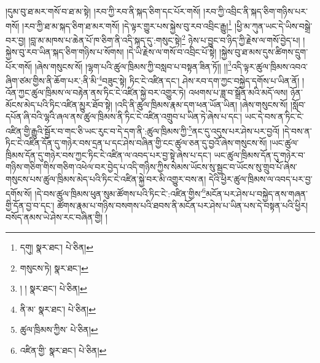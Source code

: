 །དུམ་བུ་ཐ་མར་གསོ་བ་ཐ་མ་སྟེ། །རབ་ཀྱི་རབ་ནི་སྐད་ཅིག་དང་པོར་གསོ། །རབ་ཀྱི་འབྲིང་ནི་སྐད་ཅིག་གཉིས་པར་གསོ། །རབ་ཀྱི་ཐ་མ་སྐད་ཅིག་ཐ་མར་གསོ། །དེ་ལྟར་གྱུར་པས་སྐྱེས་བུ་རབ་འབྲིང་རྒྱུ།\footnote{དགུ།  སྣར་ཐང་།  པེ་ཅིན། } །ཕྱི་མ་ཀུན་ཡང་དེ་ཡིས་བསྒྲེ་བར་བྱ། །བླ་མ་མཁས་པ་ཆེན་པོ་ཁ་ཅིག་ནི་འདི་སྐད་དུ་:གསུང་སྟེ།\footnote{གསུངས་ཏེ།  སྣར་ཐང་། } ཉེས་པ་བྱུང་བ་ཉིད་ཀྱི་རྗེས་ལ་གསོ་བྱེད་པ། །སྐྱེས་བུ་རབ་ཡིན་སྐད་ཅིག་གཉིས་པ་སོགས། །དེ་ཡི་རྗེས་ལ་གསོ་བ་འབྲིང་པོ་སྟེ། །སྐྱེས་བུ་ཐ་མས་དུས་ཚིགས་དྲུག་པོར་གསོ། །ཞེས་གསུངས་སོ། །ལྷག་པའི་ཚུལ་ཁྲིམས་ཀྱི་བསླབ་པ་བསྟན་ཟིན་ཏོ།། །།\footnote{། །  སྣར་ཐང་།  པེ་ཅིན། }འདི་ལྟར་ཚུལ་ཁྲིམས་འབའ་ཞིག་ཙམ་གྱིས་ནི་ཆོག་པར་:ནི་མི་\footnote{ནི་མ་  སྣར་ཐང་།  པེ་ཅིན། }བཟུང་སྟེ། ཏིང་ངེ་འཛིན་དང་། ཤེས་རབ་དག་ཀྱང་བསྐྱེད་དགོས་པ་ཡིན་ནོ། །འོན་ཀྱང་ཚུལ་ཁྲིམས་ལ་བརྟེན་ནས་ཏིང་ངེ་འཛིན་སྐྱེ་བར་འགྱུར་ཏེ། འཕགས་པ་ཟླ་བ་སྒྲོན་མའི་མདོ་ལས། ཉོན་མོངས་མེད་པའི་ཏིང་འཛིན་མྱུར་ཐོབ་སྟེ། །འདི་ནི་ཚུལ་ཁྲིམས་རྣམ་དག་ཕན་ཡོན་ཡིན། །ཞེས་གསུངས་སོ། །སློབ་དཔོན་ཞི་བའི་ལྷའི་ཞལ་ནས་ཚུལ་ཁྲིམས་ནི་ཏིང་ངེ་འཛིན་འགྲུབ་པ་ཡིན་ཏེ་ཞེས་པ་དང་། ཡང་དེ་བས་ན་ཏིང་ངེ་འཛིན་གྱི་རྒྱུའི་སྦྱོར་བ་གང་ཅི་ཡང་རུང་བ་དེ་དག་ནི་:ཚུལ་ཁྲིམས་ཀྱི་\footnote{ཚུལ་ཁྲིམས་ཀྱིས་  པེ་ཅིན། }ནང་དུ་འདུས་པར་ཤེས་པར་བྱའོ། །དེ་བས་ན་ཏིང་ངེ་འཛིན་དོན་དུ་གཉེར་བས་དྲན་པ་དང་ཤེས་བཞིན་གྱི་ངང་ཚུལ་ཅན་དུ་བྱའོ་ཞེས་གསུངས་སོ། །ཡང་ཚུལ་ཁྲིམས་དོན་དུ་གཉེར་བས་ཀྱང་ཏིང་ངེ་འཛིན་ལ་འབད་པར་བྱ་སྟེ་ཞེས་པ་དང་། ཡང་ཚུལ་ཁྲིམས་དོན་དུ་གཉེར་བ་གཉིས་གཅིག་གིས་གཅིག་འཕེལ་བར་བྱེད་པ་འདི་གཉིས་ཀྱིས་སེམས་ཡོངས་སུ་སྦྱང་བ་ཡོངས་སུ་གྲུབ་པོ་ཞེས་གསུངས་པས་ཚུལ་ཁྲིམས་མེད་པའི་ཏིང་ངེ་འཛིན་སྐྱེ་བར་མི་འགྱུར་བས་ན། དེའི་ཕྱིར་ཚུལ་ཁྲིམས་ལ་འབད་པར་བྱ་དགོས་སོ། །དེ་བས་ཚུལ་ཁྲིམས་ཕུན་སུམ་ཚོགས་པའི་ཏིང་ངེ་:འཛིན་གྱིས་\footnote{འཛིན་གྱི་  སྣར་ཐང་།  པེ་ཅིན། }མངོན་པར་ཤེས་པ་བསྐྱེད་ནས་གཞན་གྱི་དོན་བྱ་བ་དང་། ཚོགས་རྣམ་པ་གཉིས་བསགས་པའི་ཐབས་ནི་མངོན་པར་ཤེས་པ་ཡིན་པས་དེ་བསྟན་པའི་ཕྱིར། བསོད་ནམས་ཡེ་ཤེས་རང་བཞིན་གྱི། །
